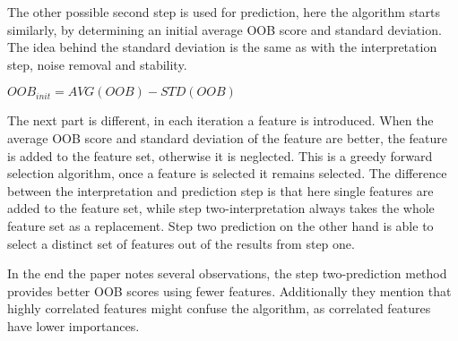 \npar

The other possible second step is used for prediction, here the algorithm starts similarly, by determining an initial average OOB score and standard deviation. The idea behind the standard deviation is the same as with the interpretation step, noise removal and stability.

\begin{center}
$OOB_{init} = AVG(OOB) - STD(OOB)$
\end{center}

The next part is different, in each iteration a feature is introduced. When the average OOB score and standard deviation of the feature are better, the feature is added to the feature set, otherwise it is neglected. This is a greedy forward selection algorithm, once a feature is selected it remains selected. The difference between the interpretation and prediction step is that here single features are added to the feature set, while step two-interpretation always takes the whole feature set as a replacement.  Step two prediction on the other hand is able to select a distinct set of features out of the results from step one.

\npar

In the end the paper notes several observations, the step two-prediction method provides better OOB scores using fewer features. Additionally they mention that highly correlated features might confuse the algorithm, as correlated features have lower importances.